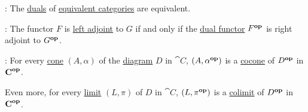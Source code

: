 \begin{proposition}
\begin{thmenum}
     : The \hyperref[def:opposite_category]{duals} of \hyperref[def:category_equivalence]{equivalent categories} are equivalent.

     : The functor \( F \) is \hyperref[def:category_adjunction]{left adjoint} to \( G \) if and only if the \hyperref[def:opposite_functor]{dual functor} \( F^\oppos \) is right adjoint to \( G^\oppos \).

     : For every \hyperref[def:category_of_cones/cone]{cone} \( (A, \alpha) \) of the \hyperref[def:categorical_diagram]{diagram} \( D \) in \( \cat{C} \), \( (A, \alpha^\oppos) \) is a \hyperref[def:category_of_cones/cone]{cocone} of \( D^\oppos \) in \( \cat{C}^\oppos \).

    Even more, for every \hyperref[def:category_of_cones/limit]{limit} \( (L, \pi) \) of \( D \) in \( \cat{C} \), \( (L, \pi^\oppos) \) is a \hyperref[def:category_of_cones/colimit]{colimit} of \( D^\oppos \) in \( \cat{C}^\oppos \).
  \end{thmenum}
\end{proposition}

